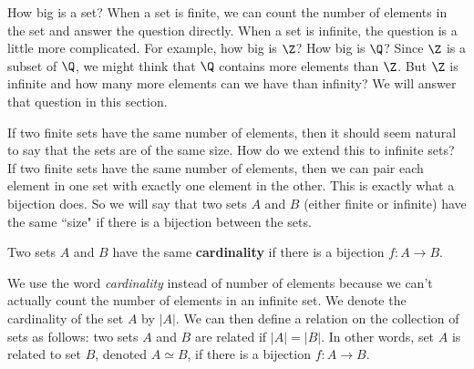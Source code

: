 \label{chap:countable}


\vspace*{-17 pt}

\vspace*{13 pt}

\label{sec_count_set_intro}

How big is a set? When a set is finite, we can count the number of elements in the set and answer the question directly. When a set is infinite, the question is a little more complicated. For example, how big is $\Z$? How big is $\Q$? Since $\Z$ is a subset of $\Q$, we might think that $\Q$ contains more elements than $\Z$. But $\Z$ is infinite and how many more elements can we have than infinity? We will answer that question in this section.

If two finite sets have the same number of elements, then it should seem natural to say that the sets are of the same size. How do we extend this to infinite sets? If two finite sets have the same number of elements, then we can pair each element in one set with exactly one element in the other. This is exactly what a bijection does. So we will say that two sets $A$ and $B$ (either finite or infinite) have the same ``size" if there is a bijection between the sets.

\begin{definition} Two sets $A$ and $B$ have the same \textbf{cardinality} if there is a bijection $f: A \to B$. 
\end{definition}

We use the word \emph{cardinality} instead of number of elements because we can't actually count the number of elements in an infinite set. We denote the cardinality of the set $A$ by $|A|$. We can then define a relation on the collection of sets as follows: two sets $A$ and $B$ are related if $|A| = |B|$. In other words, set $A$ is related to set $B$, denoted $A \simeq B$, if there is a bijection $f : A \to B$. 

